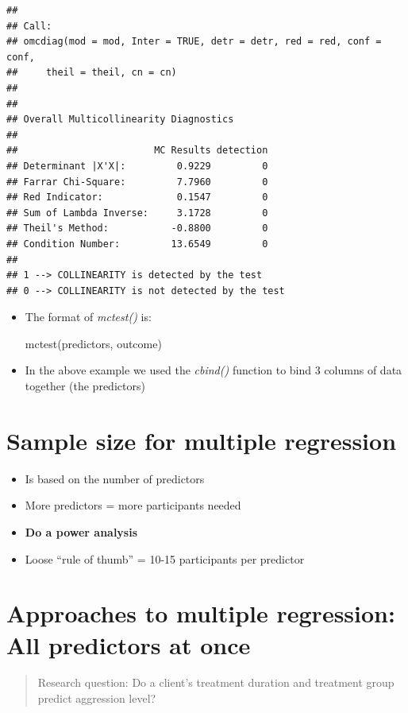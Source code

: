 \documentclass[
]{book}
\providecommand{\tightlist}{%
  \setlength{\itemsep}{0pt}\setlength{\parskip}{0pt}}
\begin{document}
\begin{verbatim}
## 
## Call:
## omcdiag(mod = mod, Inter = TRUE, detr = detr, red = red, conf = conf, 
##     theil = theil, cn = cn)
## 
## 
## Overall Multicollinearity Diagnostics
## 
##                        MC Results detection
## Determinant |X'X|:         0.9229         0
## Farrar Chi-Square:         7.7960         0
## Red Indicator:             0.1547         0
## Sum of Lambda Inverse:     3.1728         0
## Theil's Method:           -0.8800         0
## Condition Number:         13.6549         0
## 
## 1 --> COLLINEARITY is detected by the test 
## 0 --> COLLINEARITY is not detected by the test
\end{verbatim}

\begin{itemize}
\item
  The format of \emph{mctest()} is:

  mctest(predictors, outcome)
\item
  In the above example we used the \emph{cbind()} function to bind 3 columns of data together (the predictors)
\end{itemize}

\hypertarget{sample-size-for-multiple-regression}{%
\section{Sample size for multiple regression}\label{sample-size-for-multiple-regression}}

\begin{itemize}
\tightlist
\item
  Is based on the number of predictors
\item
  More predictors = more participants needed
\item
  \textbf{Do a power analysis}
\item
  Loose ``rule of thumb'' = 10-15 participants per predictor
\end{itemize}

\hypertarget{approaches-to-multiple-regression-all-predictors-at-once}{%
\section{Approaches to multiple regression: All predictors at once}\label{approaches-to-multiple-regression-all-predictors-at-once}}

\begin{quote}
Research question: Do a client's treatment duration and treatment group predict aggression level?
\end{quote}
\end{document}
